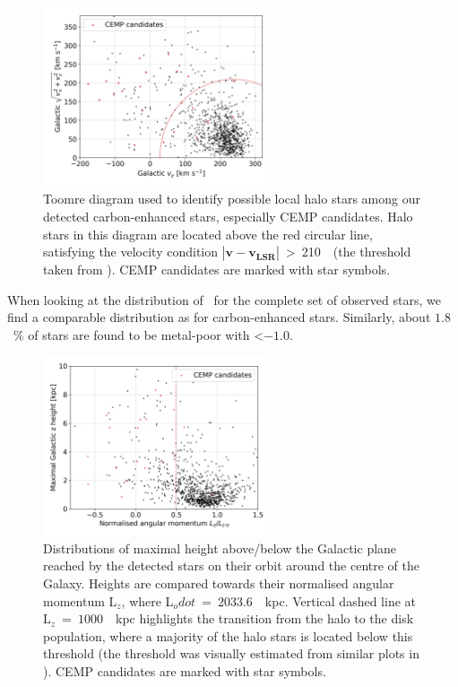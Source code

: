 \begin{figure}
	\centering
	\includegraphics[width=0.6\textwidth]{carbon_orbits_vy_vxvz.png}
	\caption{Toomre diagram used to identify possible local halo stars among our detected carbon-enhanced stars, especially CEMP candidates. Halo stars in this diagram are located above the red circular line, satisfying the velocity condition $\left|\mathbf{v} - \mathbf{v_{LSR}} \right|$~>~210~\kms\ (the threshold taken from \citet{2018ApJ...860L..11K}). CEMP candidates are marked with star symbols.}
	\label{fig:orbits_vxvyvz}
\end{figure}

When looking at the distribution of \Feh\ for the complete set of observed stars, we find a comparable distribution as for carbon-enhanced stars. Similarly, about $1.8$~\% of stars are found to be metal-poor with \Feh \textless $-1.0$.

\begin{figure}
	\centering
	\includegraphics[width=0.6\textwidth]{carbon_orbits_zmax_lznorm.png}
	\caption{Distributions of maximal height above/below the Galactic plane reached by the detected stars on their orbit around the centre of the Galaxy. Heights are compared towards their normalised angular momentum L$_z$, where L$_odot$~=~$2033.6$~\kms~kpc. Vertical dashed line at L$_z$~=~$1000$~\kms~kpc highlights the transition from the halo to the disk population, where a majority of the halo stars is located below this threshold (the threshold was visually estimated from similar plots in \citet{2018ApJ...860L..11K}).  CEMP candidates are marked with star symbols.}
	\label{fig:orbits_zmax}
\end{figure}

